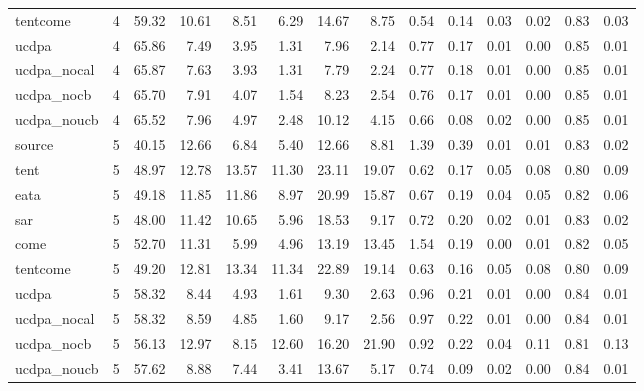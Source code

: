 \begin{tabular}{lrrrrrrrrrrrrr}
tentcome & 4 & 59.32 & 10.61 & 8.51 & 6.29 & 14.67 & 8.75 & 0.54 & 0.14 & 0.03 & 0.02 & 0.83 & 0.03 \\
ucdpa & 4 & 65.86 & 7.49 & 3.95 & 1.31 & 7.96 & 2.14 & 0.77 & 0.17 & 0.01 & 0.00 & 0.85 & 0.01 \\
ucdpa_nocal & 4 & 65.87 & 7.63 & 3.93 & 1.31 & 7.79 & 2.24 & 0.77 & 0.18 & 0.01 & 0.00 & 0.85 & 0.01 \\
ucdpa_nocb & 4 & 65.70 & 7.91 & 4.07 & 1.54 & 8.23 & 2.54 & 0.76 & 0.17 & 0.01 & 0.00 & 0.85 & 0.01 \\
ucdpa_noucb & 4 & 65.52 & 7.96 & 4.97 & 2.48 & 10.12 & 4.15 & 0.66 & 0.08 & 0.02 & 0.00 & 0.85 & 0.01 \\
source & 5 & 40.15 & 12.66 & 6.84 & 5.40 & 12.66 & 8.81 & 1.39 & 0.39 & 0.01 & 0.01 & 0.83 & 0.02 \\
tent & 5 & 48.97 & 12.78 & 13.57 & 11.30 & 23.11 & 19.07 & 0.62 & 0.17 & 0.05 & 0.08 & 0.80 & 0.09 \\
eata & 5 & 49.18 & 11.85 & 11.86 & 8.97 & 20.99 & 15.87 & 0.67 & 0.19 & 0.04 & 0.05 & 0.82 & 0.06 \\
sar & 5 & 48.00 & 11.42 & 10.65 & 5.96 & 18.53 & 9.17 & 0.72 & 0.20 & 0.02 & 0.01 & 0.83 & 0.02 \\
come & 5 & 52.70 & 11.31 & 5.99 & 4.96 & 13.19 & 13.45 & 1.54 & 0.19 & 0.00 & 0.01 & 0.82 & 0.05 \\
tentcome & 5 & 49.20 & 12.81 & 13.34 & 11.34 & 22.89 & 19.14 & 0.63 & 0.16 & 0.05 & 0.08 & 0.80 & 0.09 \\
ucdpa & 5 & 58.32 & 8.44 & 4.93 & 1.61 & 9.30 & 2.63 & 0.96 & 0.21 & 0.01 & 0.00 & 0.84 & 0.01 \\
ucdpa_nocal & 5 & 58.32 & 8.59 & 4.85 & 1.60 & 9.17 & 2.56 & 0.97 & 0.22 & 0.01 & 0.00 & 0.84 & 0.01 \\
ucdpa_nocb & 5 & 56.13 & 12.97 & 8.15 & 12.60 & 16.20 & 21.90 & 0.92 & 0.22 & 0.04 & 0.11 & 0.81 & 0.13 \\
ucdpa_noucb & 5 & 57.62 & 8.88 & 7.44 & 3.41 & 13.67 & 5.17 & 0.74 & 0.09 & 0.02 & 0.00 & 0.84 & 0.01 \\
\bottomrule
\end{tabular}

